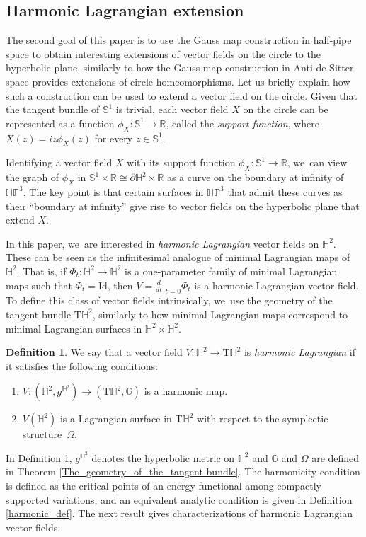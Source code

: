 \documentclass[JEP,XML,SOM,Unicode,NoEqCountersInSection, NoFloatCountersInSection,published]{cedram}
\theoremstyle{plain}
\theoremstyle{definition}
\newtheorem{defi}[cor]{Definition}
\newcommand{\HP}{\mathbb{HP}^3}
\begin{document}
\subsection{Harmonic Lagrangian extension}

The second goal of this paper is to use the Gauss map construction in half-pipe space to obtain interesting extensions of vector fields on the circle to the hyperbolic plane, similarly to how the Gauss map construction in Anti-de Sitter space provides extensions of circle homeomorphisms. Let us briefly explain how such a construction can be used to extend a vector field on the circle. Given that the tangent bundle of \(\mathbb{S}^1\) is trivial, each vector field \(X\) on the circle can be represented as a function \(\phi_X: \mathbb{S}^1 \to \mathbb{R}\), called the \emph{support function}, where \(X(z) = iz\phi_X(z)\) for every \(z \in \mathbb{S}^1\).

Identifying a vector field \(X\) with its support function \(\phi_X: \mathbb{S}^1 \to \mathbb{R}\), we~can view the graph of \(\phi_X\) in \(\mathbb{S}^1 \times \mathbb{R} \cong \partial \mathbb{H}^2 \times \mathbb{R}\) as a curve on the boundary at infinity of \(\HP\). The key point is that certain surfaces in \(\HP\) that admit these curves as their ``boundary at infinity'' give rise to vector fields on the hyperbolic plane that extend \(X\).

In this paper, we~are interested in \emph{harmonic Lagrangian} vector fields on \(\mathbb{H}^2\). These can be seen as the infinitesimal analogue of minimal Lagrangian maps of \(\mathbb{H}^2\). That is, if \(\Phi_t: \mathbb{H}^2 \to \mathbb{H}^2\) is a one-parameter family of minimal Lagrangian maps such that \(\Phi_t = \mathrm{Id}\), then \(V = \frac{d}{dt}\big\lvert_{t=0} \Phi_t\) is a harmonic Lagrangian vector field. To define this class of vector fields intrinsically, we~use the geometry of the tangent bundle \(\mathrm{T}\mathbb{H}^2\), similarly to how minimal Lagrangian maps correspond to minimal Lagrangian surfaces in \(\mathbb{H}^2 \times \mathbb{H}^2\).

\begin{defi}\label{intro_def1}
We say that a vector field \(V: \mathbb{H}^2 \to \mathrm{T}\mathbb{H}^2\) is \emph{harmonic Lagrangian} if it satisfies the following conditions:
\begin{enumerate}
\item \(V: (\mathbb{H}^2, g^{\mathbb{H}^2}) \to (\mathrm{T}\mathbb{H}^2, \mathbb{G})\) is a harmonic map.
\item \(V(\mathbb{H}^2)\) is a Lagrangian surface in \(\mathrm{T}\mathbb{H}^2\) with respect to the symplectic structure~\(\Omega\).
\end{enumerate}
\end{defi}
In Definition \ref{intro_def1}, \(g^{\mathbb{H}^2}\) denotes the hyperbolic metric on \(\mathbb{H}^2\) and \(\mathbb{G}\) and \(\Omega\) are defined in Theorem \ref{The_geometry_of_the_tangent bundle}. The harmonicity condition is defined as the critical points of an energy functional among compactly supported variations, and an equivalent analytic condition is given in Definition \ref{harmonic_def}. The next result gives characterizations of harmonic Lagrangian vector fields.
\end{document}
